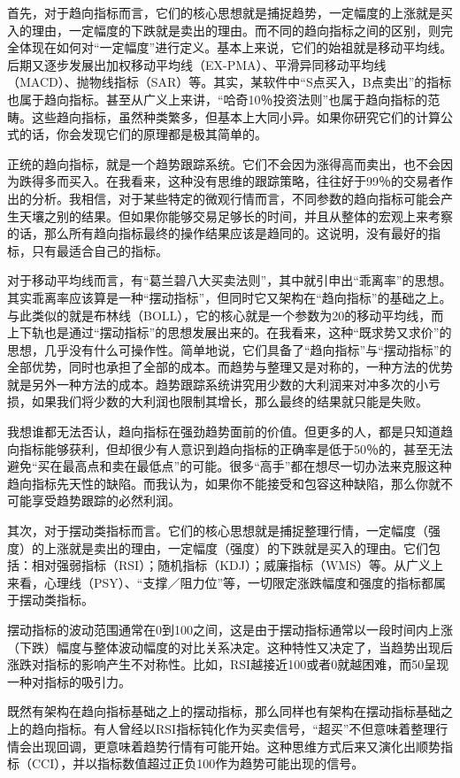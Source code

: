首先，对于趋向指标而言，它们的核心思想就是捕捉趋势，一定幅度的上涨就是买入的理由，一定幅度的下跌就是卖出的理由。而不同的趋向指标之间的区别，则完全体现在如何对“一定幅度”进行定义。基本上来说，它们的始祖就是移动平均线。后期又逐步发展出加权移动平均线（EX-PMA）、平滑异同移动平均线（MACD）、抛物线指标（SAR）等。其实，某软件中“S点买入，B点卖出”的指标也属于趋向指标。甚至从广义上来讲，“哈奇10％投资法则”也属于趋向指标的范畴。这些趋向指标，虽然种类繁多，但基本上大同小异。如果你研究它们的计算公式的话，你会发现它们的原理都是极其简单的。

正统的趋向指标，就是一个趋势跟踪系统。它们不会因为涨得高而卖出，也不会因为跌得多而买入。在我看来，这种没有思维的跟踪策略，往往好于99％的交易者作出的分析。我相信，对于某些特定的微观行情而言，不同参数的趋向指标可能会产生天壤之别的结果。但如果你能够交易足够长的时间，并且从整体的宏观上来考察的话，那么所有趋向指标最终的操作结果应该是趋同的。这说明，没有最好的指标，只有最适合自己的指标。

对于移动平均线而言，有“葛兰碧八大买卖法则”，其中就引申出“乖离率”的思想。其实乖离率应该算是一种“摆动指标”，但同时它又架构在“趋向指标”的基础之上。与此类似的就是布林线（BOLL），它的核心就是一个参数为20的移动平均线，而上下轨也是通过“摆动指标”的思想发展出来的。在我看来，这种“既求势又求价”的思想，几乎没有什么可操作性。简单地说，它们具备了“趋向指标”与“摆动指标”的全部优势，同时也承担了全部的成本。而趋势与整理又是对称的，一种方法的优势就是另外一种方法的成本。趋势跟踪系统讲究用少数的大利润来对冲多次的小亏损，如果我们将少数的大利润也限制其增长，那么最终的结果就只能是失败。

我想谁都无法否认，趋向指标在强劲趋势面前的价值。但更多的人，都是只知道趋向指标能够获利，但却很少有人意识到趋向指标的正确率是低于50％的，甚至无法避免“买在最高点和卖在最低点”的可能。很多“高手”都在想尽一切办法来克服这种趋向指标先天性的缺陷。而我认为，如果你不能接受和包容这种缺陷，那么你就不可能享受趋势跟踪的必然利润。

其次，对于摆动类指标而言。它们的核心思想就是捕捉整理行情，一定幅度（强度）的上涨就是卖出的理由，一定幅度（强度）的下跌就是买入的理由。它们包括：相对强弱指标（RSI）；随机指标（KDJ）；威廉指标（WMS）等。从广义上来看，心理线（PSY）、“支撑／阻力位”等，一切限定涨跌幅度和强度的指标都属于摆动类指标。

摆动指标的波动范围通常在0到100之间，这是由于摆动指标通常以一段时间内上涨（下跌）幅度与整体波动幅度的对比关系决定。这种特性又决定了，当趋势出现后涨跌对指标的影响产生不对称性。比如，RSI越接近100或者0就越困难，而50呈现一种对指标的吸引力。

既然有架构在趋向指标基础之上的摆动指标，那么同样也有架构在摆动指标基础之上的趋向指标。有人曾经以RSI指标钝化作为买卖信号，“超买”不但意味着整理行情会出现回调，更意味着趋势行情有可能开始。这种思维方式后来又演化出顺势指标（CCI），并以指标数值超过正负100作为趋势可能出现的信号。

